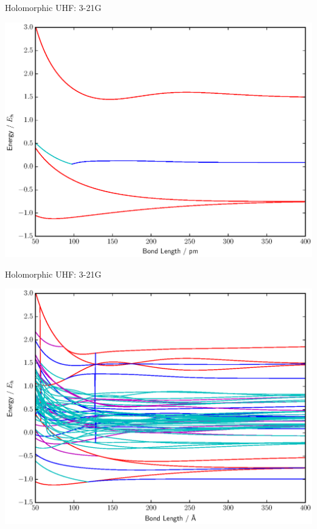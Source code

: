 \documentclass{beamer}
\begin{document}
\begin{frame}{Holomorphic UHF:  3-21G}
\vspace{-0.9em}
  \begin{center}
    \includegraphics[scale=0.45]{BFGS_stand_UHF_HH_3-21g}
  \end{center}
\end{frame}

\begin{frame}{Holomorphic UHF:  3-21G}
\vspace{-0.9em}
  \begin{center}
    \includegraphics[scale=0.45]{BFGS_UHF_HH_3-21g}
  \end{center}
\end{frame}
\end{document}
